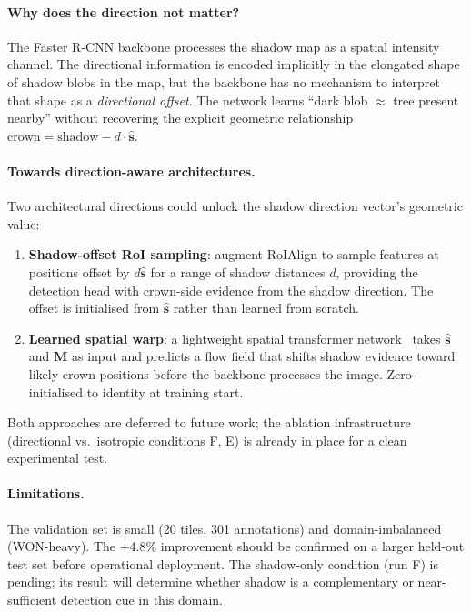 \documentclass[10pt,twocolumn]{article}
\begin{document}
\paragraph{Why does the direction not matter?}
The Faster R-CNN backbone processes the shadow map as a spatial intensity
channel. The directional information is encoded implicitly in the elongated
shape of shadow blobs in the map, but the backbone has no mechanism to
interpret that shape as a \emph{directional offset}. The network learns
``dark blob $\approx$ tree present nearby'' without recovering the explicit
geometric relationship $\text{crown} = \text{shadow} - d \cdot \hat{\mathbf{s}}$.

\paragraph{Towards direction-aware architectures.}
Two architectural directions could unlock the shadow direction vector's
geometric value:
\begin{enumerate}
  \item \textbf{Shadow-offset RoI sampling}: augment RoIAlign to sample
        features at positions offset by $d\hat{\mathbf{s}}$ for a range of
        shadow distances $d$, providing the detection head with crown-side
        evidence from the shadow direction. The offset is initialised from
        $\hat{\mathbf{s}}$ rather than learned from scratch.
  \item \textbf{Learned spatial warp}: a lightweight spatial transformer
        network~\cite{jaderberg2015spatial} takes $\hat{\mathbf{s}}$ and
        $\mathbf{M}$ as input and predicts a flow field that shifts shadow
        evidence toward likely crown positions before the backbone processes
        the image. Zero-initialised to identity at training start.
\end{enumerate}
Both approaches are deferred to future work; the ablation infrastructure
(directional vs.\ isotropic conditions F, E) is already in place for
a clean experimental test.

\paragraph{Limitations.}
The validation set is small (20 tiles, 301 annotations) and
domain-imbalanced (WON-heavy). The +4.8\% improvement should be confirmed on
a larger held-out test set before operational deployment. The shadow-only
condition (run F) is pending; its result will determine whether shadow is a
complementary or near-sufficient detection cue in this domain.
\end{document}
